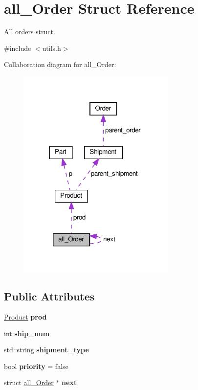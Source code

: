\hypertarget{structall__Order}{}\section{all\+\_\+\+Order Struct Reference}
\label{structall__Order}


All orders struct.  




{\ttfamily \#include $<$utils.\+h$>$}



Collaboration diagram for all\+\_\+\+Order\+:\nopagebreak
\begin{figure}[H]
\begin{center}
\leavevmode
\includegraphics[width=221pt]{structall__Order__coll__graph}
\end{center}
\end{figure}
\subsection*{Public Attributes}
\begin{DoxyCompactItemize}
\item 
\mbox{\label{structall__Order_abc229a6a4397223dda36c862d7a3b54c}} 
\hyperlink{structProduct}{Product} {\bfseries prod}
\item 
\mbox{\label{structall__Order_ad4b0a583424de97e7803edae8e163644}} 
int {\bfseries ship\+\_\+num}
\item 
\mbox{\label{structall__Order_a1f394679c4b09fab73b5e7b0284481a9}} 
std\+::string {\bfseries shipment\+\_\+type}
\item 
\mbox{\label{structall__Order_a75278cdaa72ad356e1408c77a7d17c1c}} 
bool {\bfseries priority} = false
\item 
\mbox{\label{structall__Order_a27427252ea752809669ea6cafd3f334d}} 
struct \hyperlink{structall__Order}{all\+\_\+\+Order} $\ast$ {\bfseries next}
\end{DoxyCompactItemize}


